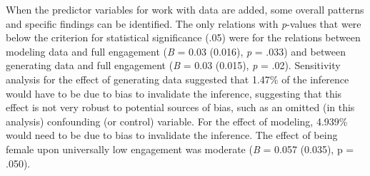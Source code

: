 \documentclass[]{book}
\theoremstyle{definition}
\theoremstyle{definition}
\theoremstyle{definition}
\theoremstyle{remark}
\begin{document}
When the predictor variables for work with data are added, some overall
patterns and specific findings can be identified. The only relations
with \emph{p}-values that were below the criterion for statistical
significance (.05) were for the relations between modeling data and full
engagement (\emph{B} = 0.03 (0.016), \emph{p} = .033) and between
generating data and full engagement (\emph{B} = 0.03 (0.015), \emph{p} =
.02). Sensitivity analysis for the effect of generating data suggested
that 1.47\% of the inference would have to be due to bias to invalidate
the inference, suggesting that this effect is not very robust to
potential sources of bias, such as an omitted (in this analysis)
confounding (or control) variable. For the effect of modeling, 4.939\%
would need to be due to bias to invalidate the inference. The effect of
being female upon universally low engagement was moderate (\emph{B} =
0.057 (0.035), p = .050).
\end{document}
